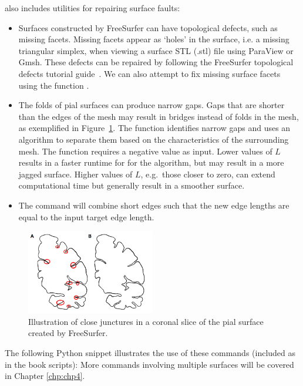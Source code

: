 \svmtk{} also includes utilities for repairing surface faults:
\begin{itemize}
\item
  Surfaces constructed by FreeSurfer can have topological defects,
  such as missing facets. Missing facets appear as `holes' in the
  surface, i.e. a missing triangular simplex, when viewing a surface
  STL (.stl) file using ParaView or Gmsh. These defects can be
  repaired by following the FreeSurfer topological defects tutorial
  guide~\cite{freesurfer-wiki}.  We can also attempt to fix missing
  surface facets using the \svmtk{} function
  .
\item
  The folds of pial surfaces can produce narrow gaps. Gaps that are
  shorter than the edges of the mesh may result in bridges instead
  of folds in the mesh, as exemplified in
  Figure~\ref{fig:chp3:juncture}. The function
  identifies narrow gaps and uses an algorithm to separate them based on 
  the characteristics of the surrounding mesh. The function requires a 
  negative value as input. Lower values of $L$ results in a faster runtime for 
  for the algorithm, but may result in a more jagged surface.  
  Higher values of $L$, e.g.~those closer to zero, can extend computational 
  time but generally result in a smoother surface.
\item 
  The command  will combine short edges
  such that the new edge lengths are equal to the input target edge
  length.
\end{itemize}
\begin{figure}\sidecaption
  \includegraphics[width=0.5\textwidth]{./graphics/chp3/juncturers-gap.png}
  \caption{Illustration of close junctures in a coronal
    slice of the pial surface created by FreeSurfer.}
  \label{fig:chp3:juncture}
\end{figure}
%
%
The following Python snippet illustrates the use of these commands
(included as  in the
book scripts):
More commands involving multiple surfaces will be
covered in Chapter \ref{chp:chp4}.

